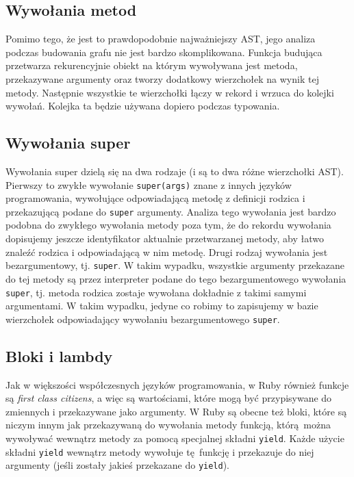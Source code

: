 \documentclass[declaration,shortabstract]{iithesis}
\begin{document}
\subsection{Wywołania metod}

Pomimo tego, że jest to prawdopodobnie najważniejszy AST, jego analiza podczas budowania grafu nie jest bardzo skomplikowana. Funkcja budująca przetwarza rekurencyjnie obiekt na którym wywoływana jest metoda, przekazywane argumenty oraz tworzy dodatkowy wierzchołek na wynik tej metody. Następnie wszystkie te wierzchołki łączy w rekord i wrzuca do kolejki wywołań. Kolejka ta będzie używana dopiero podczas typowania.

\subsection{Wywołania super}

Wywołania super dzielą się na dwa rodzaje (i są to dwa różne wierzchołki AST). Pierwszy to zwykłe wywołanie \texttt{super(args)} znane z innych języków programowania, wywołujące odpowiadającą metodę z definicji rodzica i przekazującą podane do \texttt{super} argumenty. Analiza tego wywołania jest bardzo podobna do zwykłego wywołania metody poza tym, że do rekordu wywołania dopisujemy jeszcze identyfikator aktualnie przetwarzanej metody, aby łatwo znaleźć rodzica i odpowiadającą w nim metodę. Drugi rodzaj wywołania jest bezargumentowy, tj. \texttt{super}. W takim wypadku, wszystkie argumenty przekazane do tej metody są przez interpreter podane do tego bezargumentowego wywołania \texttt{super}, tj. metoda rodzica zostaje wywołana dokładnie z takimi samymi argumentami. W takim wypadku, jedyne co robimy to zapisujemy w bazie wierzchołek odpowiadający wywołaniu bezargumentowego \texttt{super}.


\subsection{Bloki i lambdy}

Jak w większości współczesnych języków programowania, w Ruby również funkcje są \textit{first class citizens}, a więc są wartościami, które mogą być przypisywane do zmiennych i przekazywane jako argumenty. W Ruby są obecne też bloki, które są niczym innym jak przekazywaną do wywołania metody funkcją, którą można wywoływać wewnątrz metody za pomocą specjalnej składni \texttt{yield}. Każde użycie składni \texttt{yield} wewnątrz metody wywołuje tę funkcję i przekazuje do niej argumenty (jeśli zostały jakieś przekazane do \texttt{yield}).
\end{document}
